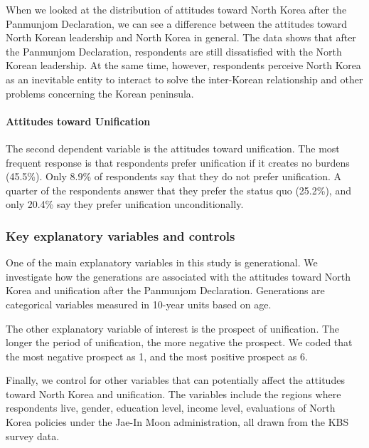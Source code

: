 \documentclass[letterpaper,10pt,twocolumn,twoside,]{pinp}
\begin{document}
When we looked at the distribution of attitudes toward North Korea after
the Panmunjom Declaration, we can see a difference between the attitudes
toward North Korean leadership and North Korea in general. The data
shows that after the Panmunjom Declaration, respondents are still
dissatisfied with the North Korean leadership. At the same time,
however, respondents perceive North Korea as an inevitable entity to
interact to solve the inter-Korean relationship and other problems
concerning the Korean peninsula.

\hypertarget{attitudes-toward-unification}{%
\paragraph{Attitudes toward
Unification}\label{attitudes-toward-unification}}

The second dependent variable is the attitudes toward unification. The
most frequent response is that respondents prefer unification if it
creates no burdens (45.5\%). Only 8.9\% of respondents say that they do
not prefer unification. A quarter of the respondents answer that they
prefer the status quo (25.2\%), and only 20.4\% say they prefer
unification unconditionally.

\hypertarget{key-explanatory-variables-and-controls}{%
\subsubsection{Key explanatory variables and
controls}\label{key-explanatory-variables-and-controls}}

One of the main explanatory variables in this study is generational. We
investigate how the generations are associated with the attitudes toward
North Korea and unification after the Panmunjom Declaration. Generations
are categorical variables measured in 10-year units based on age.

The other explanatory variable of interest is the prospect of
unification. The longer the period of unification, the more negative the
prospect. We coded that the most negative prospect as 1, and the most
positive prospect as 6.

Finally, we control for other variables that can potentially affect the
attitudes toward North Korea and unification. The variables include the
regions where respondents live, gender, education level, income level,
evaluations of North Korea policies under the Jae-In Moon
administration, all drawn from the KBS survey data.
\end{document}
